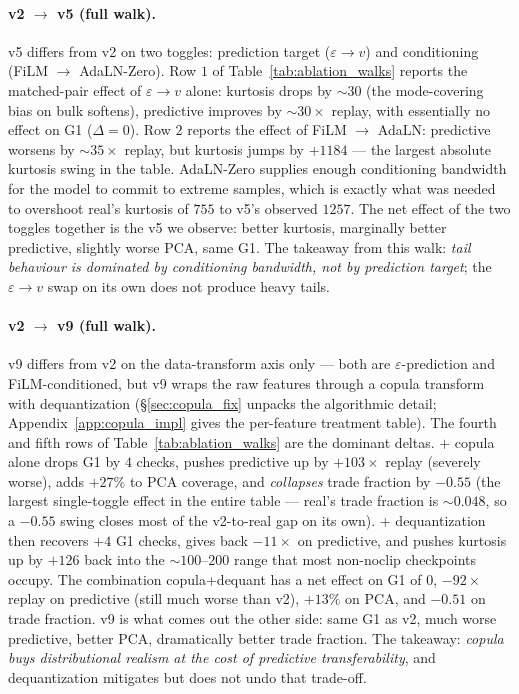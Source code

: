 \documentclass[journal]{IEEEtran}
\newcommand{\eps}{\varepsilon}
\theoremstyle{definition}   %
\begin{document}
\paragraph{v2 $\to$ v5 (full walk).}
v5 differs from v2 on two toggles: prediction target
($\eps \to v$) and conditioning (FiLM $\to$ AdaLN-Zero). Row $1$ of
Table~\ref{tab:ablation_walks} reports the matched-pair effect of
$\eps \to v$ alone: kurtosis drops by $\sim 30$ (the mode-covering
bias on bulk softens), predictive improves by $\sim 30\times$
replay, with essentially no effect on G1 ($\Delta = 0$). Row $2$
reports the effect of FiLM $\to$ AdaLN: predictive worsens by
$\sim 35\times$ replay, but kurtosis jumps by $+1184$ --- the
largest absolute kurtosis swing in the table. AdaLN-Zero supplies
enough conditioning bandwidth for the model to commit to extreme
samples, which is exactly what was needed to overshoot real's
kurtosis of $755$ to v5's observed $1257$. The net effect of the
two toggles together is the v5 we observe: better kurtosis,
marginally better predictive, slightly worse PCA, same G1. The
takeaway from this walk: \emph{tail behaviour is dominated by
conditioning bandwidth, not by prediction target}; the
$\eps \to v$ swap on its own does not produce heavy tails.

\paragraph{v2 $\to$ v9 (full walk).}
v9 differs from v2 on the data-transform axis only --- both are
$\eps$-prediction and FiLM-conditioned, but v9 wraps the raw
features through a copula transform with dequantization
(\S\ref{sec:copula_fix} unpacks the algorithmic detail;
Appendix~\ref{app:copula_impl} gives the per-feature treatment
table). The fourth and fifth rows of Table~\ref{tab:ablation_walks}
are the dominant deltas. $+$ copula alone drops G1 by $4$ checks,
pushes predictive up by $+103\times$ replay (severely worse), adds
$+27\%$ to PCA coverage, and \emph{collapses} trade fraction by
$-0.55$ (the largest single-toggle effect in the entire table ---
real's trade fraction is $\sim 0.048$, so a $-0.55$ swing closes
most of the v2-to-real gap on its own). $+$ dequantization then
recovers $+4$ G1 checks, gives back $-11\times$ on predictive, and
pushes kurtosis up by $+126$ back into the
$\sim 100$--$200$ range that most non-noclip checkpoints occupy.
The combination copula+dequant has a net effect on G1 of $0$,
$-92\times$ replay on predictive (still much worse than v2),
$+13\%$ on PCA, and $-0.51$ on trade fraction. v9 is what comes
out the other side: same G1 as v2, much worse predictive, better
PCA, dramatically better trade fraction. The takeaway: \emph{copula
buys distributional realism at the cost of predictive
transferability}, and dequantization mitigates but does not undo
that trade-off.
\end{document}
